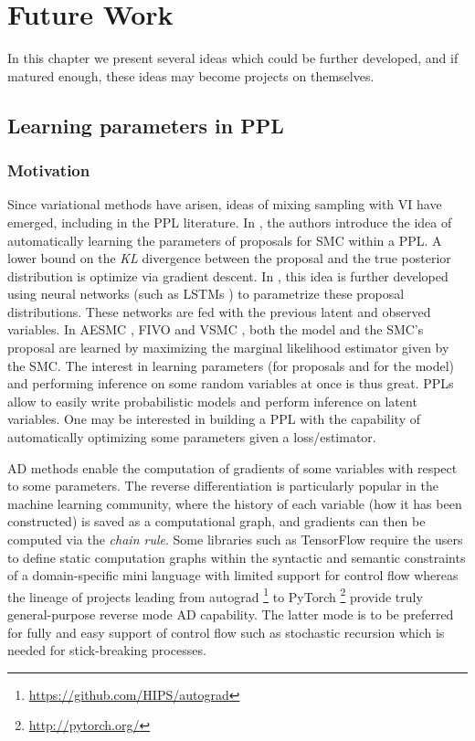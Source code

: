 \chapter{Future Work}
In this chapter we present several ideas which could be further developed, and if matured enough, these ideas may become projects on themselves.


\section{Learning parameters in PPL}
\subsection{Motivation}
Since variational methods have arisen, ideas of mixing sampling with \gls{VI} have emerged, including in the \gls{PPL} literature.
In \cite{Wingate:2013tq}, the authors introduce the idea of automatically learning the parameters of proposals for \gls{SMC} within a \gls{PPL}. A lower bound on the \emph{KL} divergence between the proposal and the true posterior distribution is optimize via gradient descent.
In \cite{Ritchie:2016ve, Le:2016te}, this idea is further developed using neural networks (such as LSTMs \cite{Hochreiter:1997fq}) to parametrize these proposal distributions. These networks are fed with the previous latent and observed variables.
In AESMC \cite{Le:2017wm}, FIVO \cite{Maddison:2017wp} and VSMC \cite{Naesseth:2017tl}, both the model and the \gls{SMC}'s proposal are learned by maximizing the marginal likelihood estimator given by the \gls{SMC}.
The interest in learning parameters (for proposals and for the model) and performing inference on some random variables at once is thus great. \gls{PPL}s allow to easily write probabilistic models and perform inference on latent variables. One may be interested in building a \gls{PPL} with the capability of automatically optimizing some parameters given a loss/estimator.

\gls{AD} methods \cite{Baydin:2015up} enable the computation of gradients of some variables with respect to some parameters. The reverse differentiation is particularly popular in the machine learning community, where the history of each variable (how it has been constructed) is saved as a computational graph, and gradients can then be computed via the \textit{chain rule}.
Some libraries such as TensorFlow \cite{Tensorflow} require the users to define static computation graphs within the syntactic and semantic constraints of a domain-specific mini language with limited support for control flow whereas the lineage of projects leading from autograd \footnote{\url{https://github.com/HIPS/autograd}} to PyTorch \footnote{\url{http://pytorch.org/}} provide truly general-purpose reverse mode \gls{AD} capability. The latter mode is to be preferred for fully and easy support of control flow such as stochastic recursion which is needed for stick-breaking processes.


